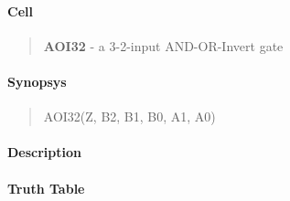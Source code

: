 \label{AOI32}
\paragraph{Cell}
\begin{quote}
    \textbf{AOI32} - a 3-2-input AND-OR-Invert gate
\end{quote}

\paragraph{Synopsys}
\begin{quote}
    AOI32(Z, B2, B1, B0, A1, A0)
\end{quote}

\paragraph{Description}

%

\paragraph{Truth Table}


